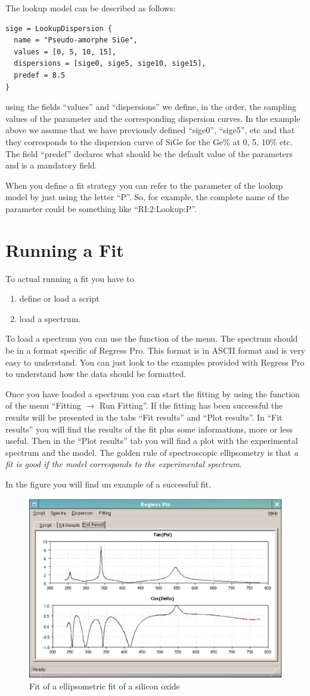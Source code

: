 \documentclass[a4paper]{report}
\begin{document}
The lookup model can be described as follows:
\begin{verbatim}
sige = LookupDispersion { 
  name = "Pseudo-amorphe SiGe",
  values = [0, 5, 10, 15],
  dispersions = [sige0, sige5, sige10, sige15],
  predef = 8.5
}
\end{verbatim}
using the fields ``values'' and ``dispersions'' we define, in the order, the sampling values of the parameter and the corresponding dispersion curves.
In the example above we assume that we have previously defined ``sige0'', ``sige5'', etc and that they corresponds to the dispersion curve of SiGe for the Ge\% at 0, 5, 10\% etc.
The field ``predef'' declares what should be the default value of the parameters and is a mandatory field.

When you define a fit strategy you can refer to the parameter of the lookup model by just using the letter ``P''.
So, for example, the complete name of the parameter could be something like ``RI:2:Lookup:P''.

\chapter{Running a Fit}
To actual running a fit you have to
\begin{enumerate}
  \item define or load a script
  \item load a spectrum.
\end{enumerate}
To load a spectrum you can use the function of the menu. The spectrum
should be in a format specific of Regress Pro. This format is in ASCII
format and is very easy to understand. You can just look to the
examples provided with Regress Pro to understand how the data should
be formatted.

Once you have loaded a spectrum you can start the fitting by using the
function of the menu ``\textsf{Fitting $\rightarrow$ Run Fitting}''. If the
fitting has been successful the results will be presented in the tabs
``Fit results'' and ``Plot results''. In ``Fit results'' you will find
the results of the fit plus some informations, more or less
useful. Then in the ``Plot results'' tab you will find a plot with the
experimental spectrum and the model. The golden rule of spectroscopic
ellipsometry is that \emph{a fit is good if the model corresponds to
the experimental spectrum}.

In the figure you will find un example of a successful fit.
\begin{figure}[!thp]
  \includegraphics[width=\textwidth]{figure/oxide-fit-1.eps}
  \caption{Fit of a ellipsometric fit of a silicon oxide}
\end{figure}
\end{document}
